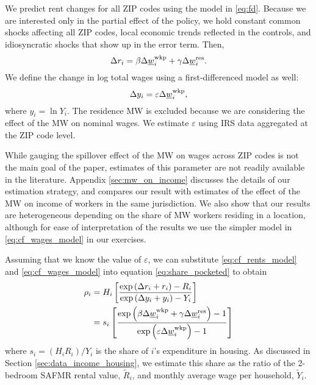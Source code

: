 We predict rent changes for all ZIP codes using the model in \eqref{eq:fd}.
Because we are interested only in the partial effect of the policy, we hold 
constant common shocks affecting all ZIP codes,
local economic trends reflected in the controls, and
idiosyncratic shocks that show up in the error term.
Then,
\begin{equation}\label{eq:cf_rents_model}
    \Delta r_i = \beta \Delta \underline{w}_i^{\text{wkp}} + \gamma \Delta \underline{w}_i^{\text{res}} .
\end{equation}
We define the change in log total wages using a first-differenced model as well:
\begin{equation}\label{eq:cf_wages_model}
    \Delta y_i = \varepsilon \Delta \underline{w}_i^{\text{wkp}} ,
\end{equation}
where $y_i=\ln Y_i$.
The residence MW is excluded because we are considering the effect of the MW on 
nominal wages.
We estimate $\varepsilon$ using IRS data aggregated at the ZIP code level.

While gauging the spillover effect of the MW on wages across ZIP codes is 
not the main goal of the paper, estimates of this parameter are not readily 
available in the literature.
Appendix \ref{sec:mw_on_income} discusses the details of our estimation 
strategy, and compares our result with estimates of the effect of the MW 
on income of workers in the same jurisdiction.
We also show that our results are heterogeneous depending on the share of 
MW workers residing in a location, although for ease of interpretation of the
results we use the simpler model in \ref{eq:cf_wages_model} in our exercises.

Assuming that we know the value of $\varepsilon$, we can substitute
\eqref{eq:cf_rents_model} and \eqref{eq:cf_wages_model} into equation
\eqref{eq:share_pocketed} to obtain
\begin{equation*}\label{eq:rho}
    \begin{split}
        \rho_i & = H_i \left[ 
        \frac{\exp \left(\Delta r_i + r_i \right) - R_i }
             {\exp \left(\Delta y_i + y_i \right) - Y_i }
        \right] \\
        & = s_i \left[
            \frac{\exp \left( \beta \Delta \underline{w}_i^{\text{wkp}} + \gamma \Delta \underline{w}_i^{\text{res}} \right) - 1 }
                {\exp \left( \varepsilon \Delta \underline{w}_i^{\text{wkp}} \right) - 1 }
            \right]
    \end{split}
\end{equation*}
where $s_i = \left(H_i R_i\right)/Y_i$ is the share of $i$'s expenditure in 
housing.
As discussed in Section \ref{sec:data_income_housing},
we estimate this share as the ratio of the 2-bedroom SAFMR rental value, 
$\tilde R_i$, and monthly average wage per household, $\tilde Y_i$.

